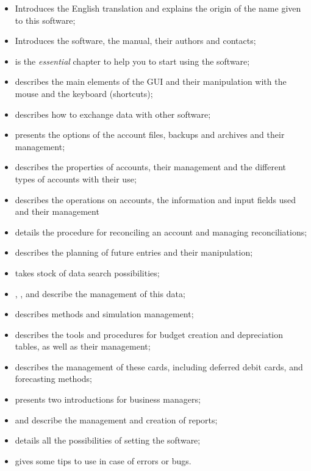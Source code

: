 \begin{itemize}%
	\item {} Introduces the English translation and explains the origin of the name given to this software;
	\item {} Introduces the software, the manual, their authors and contacts;
	\item {} is the \emph{essential} chapter to help you to start using the software;
	\item {} describes the main elements of the GUI and their manipulation with the mouse and the keyboard (shortcuts);
	\item {} describes how to exchange data with other software;
	\item {} presents the options of the account files, backups and archives and their management;
	\item {} describes the properties of accounts, their management and the different types of accounts with their use;
	\item {} describes the operations on accounts, the information and input fields used and their management
	\item {} details the procedure for reconciling an account and managing reconciliations;
	\item {} describes the planning of future entries and their manipulation;
	\item {} takes stock of data search possibilities;
	\item {}, ,  and  describe the management of this data;
	\item {} describes methods and simulation management;
	\item {} describes the tools and procedures for budget creation and depreciation tables, as well as their management;
	\item {} describes the management of these cards, including deferred debit cards, and forecasting methods;
	\item {} presents two introductions for business managers;
	\item {} and  describe the management and creation of reports;
	\item {} details all the possibilities of setting the software;
	\item {} gives some tips to use in case of errors or bugs.
\end{itemize}

